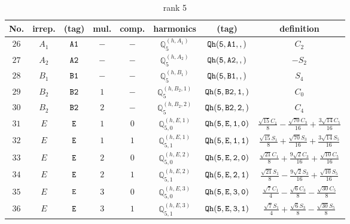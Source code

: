 \documentclass[fleqn,8pt]{jsarticle}
\begin{document}
\begin{table}[ht!]
\begin{center}
\caption{rank 5}
\renewcommand{\arraystretch}{1.3}
\begin{tabular}{cccccccc} \hline \hline
No. & irrep. & (tag) & mul. & comp. & harmonics & (tag) & definition \\ \hline
$ 26 $ & $ A_{1} $ & $ {\tt A1} $ & $ - $ & $ - $ & $ \mathbb{Q}_{5}^{(h,A_{1})} $ & $ {\tt Qh(5,A1,,)} $ & $ C_{2} $ \\
$ 27 $ & $ A_{2} $ & $ {\tt A2} $ & $ - $ & $ - $ & $ \mathbb{Q}_{5}^{(h,A_{2})} $ & $ {\tt Qh(5,A2,,)} $ & $ - S_{2} $ \\
$ 28 $ & $ B_{1} $ & $ {\tt B1} $ & $ - $ & $ - $ & $ \mathbb{Q}_{5}^{(h,B_{1})} $ & $ {\tt Qh(5,B1,,)} $ & $ S_{4} $ \\
$ 29 $ & $ B_{2} $ & $ {\tt B2} $ & $ 1 $ & $ - $ & $ \mathbb{Q}_{5}^{(h,B_{2},1)} $ & $ {\tt Qh(5,B2,1,)} $ & $ C_{0} $ \\
$ 30 $ & $ B_{2} $ & $ {\tt B2} $ & $ 2 $ & $ - $ & $ \mathbb{Q}_{5}^{(h,B_{2},2)} $ & $ {\tt Qh(5,B2,2,)} $ & $ C_{4} $ \\
$ 31 $ & $ E $ & $ {\tt E} $ & $ 1 $ & $ 0 $ & $ \mathbb{Q}_{5,0}^{(h,E,1)} $ & $ {\tt Qh(5,E,1,0)} $ & $ \frac{\sqrt{15} C_{1}}{8} - \frac{\sqrt{70} C_{3}}{16} + \frac{3 \sqrt{14} C_{5}}{16} $ \\
$ 32 $ & $ E $ & $ {\tt E} $ & $ 1 $ & $ 1 $ & $ \mathbb{Q}_{5,1}^{(h,E,1)} $ & $ {\tt Qh(5,E,1,1)} $ & $ \frac{\sqrt{15} S_{1}}{8} + \frac{\sqrt{70} S_{3}}{16} + \frac{3 \sqrt{14} S_{5}}{16} $ \\
$ 33 $ & $ E $ & $ {\tt E} $ & $ 2 $ & $ 0 $ & $ \mathbb{Q}_{5,0}^{(h,E,2)} $ & $ {\tt Qh(5,E,2,0)} $ & $ \frac{\sqrt{21} C_{1}}{8} + \frac{9 \sqrt{2} C_{3}}{16} + \frac{\sqrt{10} C_{5}}{16} $ \\
$ 34 $ & $ E $ & $ {\tt E} $ & $ 2 $ & $ 1 $ & $ \mathbb{Q}_{5,1}^{(h,E,2)} $ & $ {\tt Qh(5,E,2,1)} $ & $ \frac{\sqrt{21} S_{1}}{8} - \frac{9 \sqrt{2} S_{3}}{16} + \frac{\sqrt{10} S_{5}}{16} $ \\
$ 35 $ & $ E $ & $ {\tt E} $ & $ 3 $ & $ 0 $ & $ \mathbb{Q}_{5,0}^{(h,E,3)} $ & $ {\tt Qh(5,E,3,0)} $ & $ \frac{\sqrt{7} C_{1}}{4} - \frac{\sqrt{6} C_{3}}{8} - \frac{\sqrt{30} C_{5}}{8} $ \\
$ 36 $ & $ E $ & $ {\tt E} $ & $ 3 $ & $ 1 $ & $ \mathbb{Q}_{5,1}^{(h,E,3)} $ & $ {\tt Qh(5,E,3,1)} $ & $ \frac{\sqrt{7} S_{1}}{4} + \frac{\sqrt{6} S_{3}}{8} - \frac{\sqrt{30} S_{5}}{8} $ \\
 \hline \hline
\end{tabular}
\end{center}
\end{table}
\end{document}
